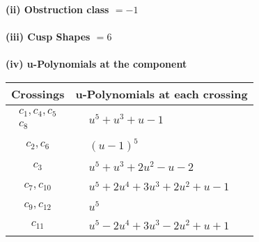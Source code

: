\documentclass[1p]{elsarticle_modified}
\theoremstyle{definition}
\begin{document}
\flushleft \textbf{(ii) Obstruction class $= -1$}\\~\\
\flushleft \textbf{(iii) Cusp Shapes $= 6$}\\~\\
\newpage\renewcommand{\arraystretch}{1}
\flushleft \textbf{(iv) u-Polynomials at the component}\newline \\
\begin{tabular}{m{50pt}|m{274pt}}
Crossings & \hspace{64pt}u-Polynomials at each crossing \\
\hline $$\begin{aligned}c_{1},c_{4},c_{5}\\c_{8}\end{aligned}$$&$\begin{aligned}
&u^5+u^3+u-1
\end{aligned}$\\
\hline $$\begin{aligned}c_{2},c_{6}\end{aligned}$$&$\begin{aligned}
&(u-1)^5
\end{aligned}$\\
\hline $$\begin{aligned}c_{3}\end{aligned}$$&$\begin{aligned}
&u^5+u^3+2 u^2- u-2
\end{aligned}$\\
\hline $$\begin{aligned}c_{7},c_{10}\end{aligned}$$&$\begin{aligned}
&u^5+2 u^4+3 u^3+2 u^2+u-1
\end{aligned}$\\
\hline $$\begin{aligned}c_{9},c_{12}\end{aligned}$$&$\begin{aligned}
&u^5
\end{aligned}$\\
\hline $$\begin{aligned}c_{11}\end{aligned}$$&$\begin{aligned}
&u^5-2 u^4+3 u^3-2 u^2+u+1
\end{aligned}$\\
\hline
\end{tabular}\\~\\
\end{document}
